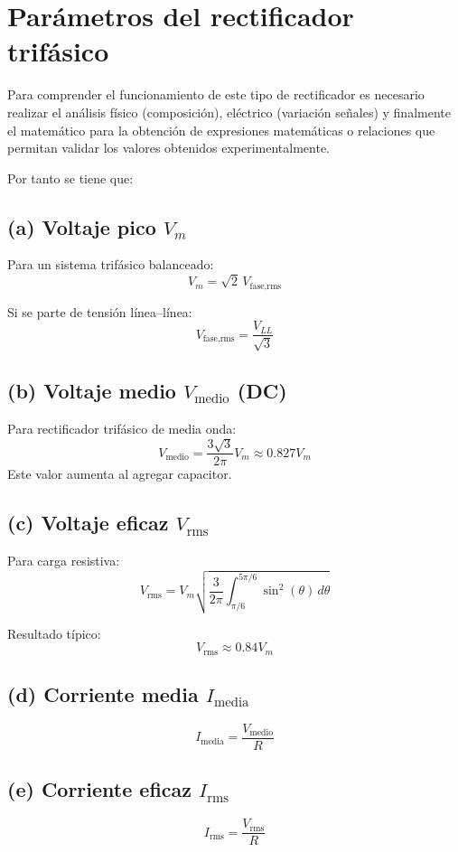 \section{Parámetros del rectificador trifásico}

Para comprender el funcionamiento de este tipo de rectificador es necesario realizar el análisis físico (composición), eléctrico (variación señales) y finalmente el matemático para la obtención de expresiones matemáticas o relaciones que permitan validar los valores obtenidos experimentalmente.

Por tanto se tiene que: \\

\subsection*{(a) Voltaje pico $V_m$}
Para un sistema trifásico balanceado:
\[
V_m = \sqrt{2} \, V_{\text{fase,rms}}
\]

Si se parte de tensión línea--línea:
\[
V_{\text{fase,rms}} = \frac{V_{LL}}{\sqrt{3}}
\]

\subsection*{(b) Voltaje medio $V_{\text{medio}}$ (DC)}
Para rectificador trifásico de media onda:
\[
V_{\text{medio}} = \frac{3\sqrt{3}}{2\pi} V_m \approx 0.827V_m
\]
Este valor aumenta al agregar capacitor.

\subsection*{(c) Voltaje eficaz $V_{\text{rms}}$}
Para carga resistiva:
\[
V_{\text{rms}} = V_m \sqrt{\frac{3}{2\pi} \int_{\pi/6}^{5\pi/6} \sin^2(\theta) \, d\theta}
\]

Resultado típico:
\[
V_{\text{rms}} \approx 0.84V_m
\]

\subsection*{(d) Corriente media $I_{\text{media}}$}
\[
I_{\text{media}} = \frac{V_{\text{medio}}}{R}
\]

\subsection*{(e) Corriente eficaz $I_{\text{rms}}$}
\[
I_{\text{rms}} = \frac{V_{\text{rms}}}{R}
\]

